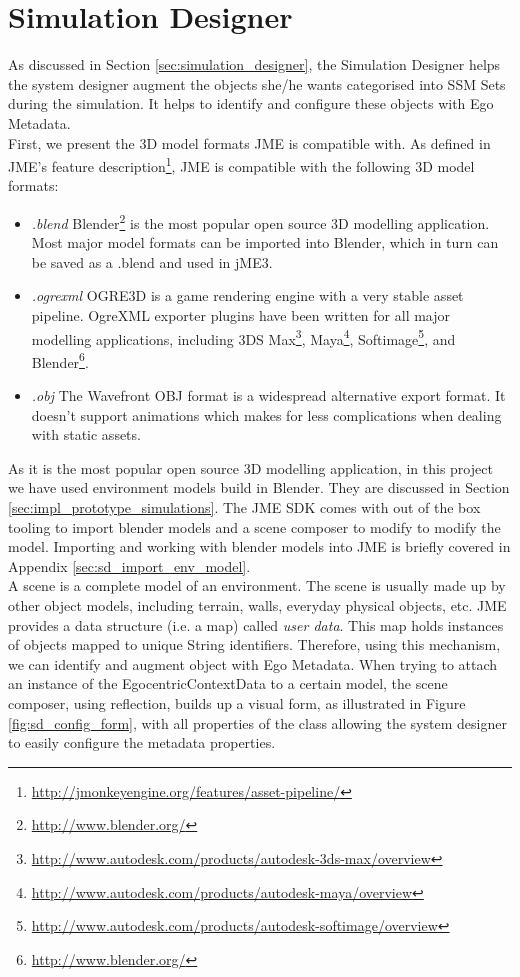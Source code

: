 \section{Simulation Designer} %
\label{sec:impl_simulation_designer}
As discussed in Section \ref{sec:simulation_designer}, the Simulation Designer helps the system designer augment the objects she/he wants categorised into SSM Sets during the simulation. It helps to identify and configure these objects with Ego Metadata.\\

First, we present the 3D model formats JME is compatible with. As defined in JME's feature description\footnote{\url{http://jmonkeyengine.org/features/asset-pipeline/}}, JME is compatible with the following 3D model formats:
\begin{itemize}
	\item \emph{.blend} Blender\footnote{\url{http://www.blender.org/}} is the most popular open source 3D modelling application. Most major model formats can be imported into Blender, which in turn can be saved as a .blend and used in jME3.
	\item \emph{.ogrexml} OGRE3D is a game rendering engine with a very stable asset pipeline. OgreXML exporter plugins have been written for all major modelling  applications, including 3DS Max\footnote{\url{http://www.autodesk.com/products/autodesk-3ds-max/overview}}, Maya\footnote{\url{http://www.autodesk.com/products/autodesk-maya/overview}}, Softimage\footnote{\url{http://www.autodesk.com/products/autodesk-softimage/overview}}, and Blender\footnote{\url{http://www.blender.org/}}.
	\item \emph{.obj} The Wavefront OBJ format is a widespread alternative export format. It doesn't support animations which makes for less complications when dealing with static assets.
\end{itemize}

As it is the most popular open source 3D modelling application, in this project we have used environment models build in Blender. They are discussed in Section \ref{sec:impl_prototype_simulations}. The JME SDK comes with out of the box tooling to import blender models and a scene composer to modify to modify the model. Importing and working with blender models into JME is briefly covered in Appendix \ref{sec:sd_import_env_model}.\\

A scene is a complete model of an environment. The scene is usually made up by other object models, including terrain, walls, everyday physical objects, etc. JME provides a data structure (i.e. a map) called \emph{user data}. This map holds instances of objects mapped to unique String identifiers. Therefore, using this mechanism, we can identify and augment object with Ego Metadata. When trying to attach an instance of the EgocentricContextData to a certain model, the scene composer, using reflection, builds up a visual form, as illustrated in Figure \ref{fig:sd_config_form}, with all properties of the class allowing the system designer to easily configure the metadata properties.\\

